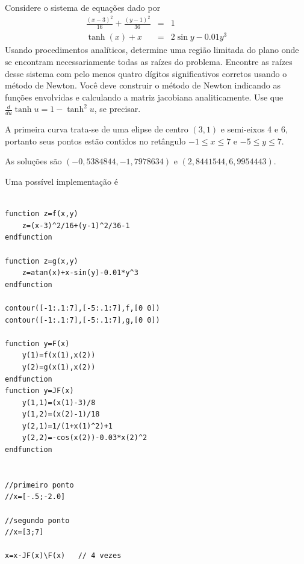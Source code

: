 \begin{exer} Considere o sistema de equações dado por
\begin{eqnarray}
\frac{(x-3)^2}{16}+\frac{(y-1)^2}{36}&=&1\\
\tanh(x)+x&=&2\sin y-0.01y^3
\end{eqnarray}
Usando procedimentos analíticos, determine uma região limitada do plano onde se encontram necessariamente todas as raízes do problema.
Encontre as raízes desse sistema com pelo menos quatro dígitos significativos corretos usando o método de Newton. Você deve construir o método de Newton indicando as funções envolvidas e calculando a matriz jacobiana analiticamente. Use que $\frac{d}{du}\tanh u = 1-\tanh^2u$, se precisar.
\end{exer}
\begin{resp}
 A primeira curva trata-se de uma elipse de centro $(3,1)$ e semi-eixos 4 e 6, portanto seus pontos estão contidos no retângulo $-1\leq x \leq 7$ e $-5\leq y \leq 7$.

As soluções são $\left( -0,5384844 , -1,7978634\right)$ e $\left(2,8441544, 6,9954443\right)$.

\ifisscilab
Uma possível implementação é
\begin{verbatim}

function z=f(x,y)
    z=(x-3)^2/16+(y-1)^2/36-1
endfunction

function z=g(x,y)
    z=atan(x)+x-sin(y)-0.01*y^3
endfunction

contour([-1:.1:7],[-5:.1:7],f,[0 0])
contour([-1:.1:7],[-5:.1:7],g,[0 0])

function y=F(x)
    y(1)=f(x(1),x(2))
    y(2)=g(x(1),x(2))
endfunction
function y=JF(x)
    y(1,1)=(x(1)-3)/8
    y(1,2)=(x(2)-1)/18
    y(2,1)=1/(1+x(1)^2)+1
    y(2,2)=-cos(x(2))-0.03*x(2)^2
endfunction 


//primeiro ponto
//x=[-.5;-2.0]

//segundo ponto
//x=[3;7]

x=x-JF(x)\F(x)   // 4 vezes
\end{verbatim}
\fi
\end{resp}


